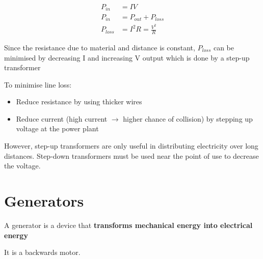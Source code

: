 	\begin{align*}
		P_{in} &= IV \\
		P_{in} &= P_{out} + P_{loss} \\
		P_{loss} &= I^2 R = \frac{V^2}{R}
	\end{align*}

	Since the resistance due to material and distance is constant, $P_{loss}$ can be minimised by decreasing I and increasing V output which is done by a step-up transformer

	To minimise line loss: 
	\begin{itemize}
		\item Reduce resistance by using thicker wires
		\item Reduce current (high current $\rightarrow$ higher chance of collision) by stepping up voltage at the power plant
	\end{itemize}

	However, step-up transformers are only useful in distributing electricity over long distances. Step-down transformers must be used near the point of use to decrease the voltage.

\section{Generators}

	A generator is a device that \textbf{transforms mechanical energy into electrical energy}

	It is a backwards motor.

